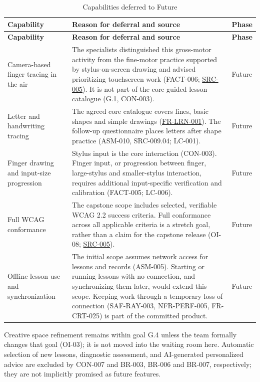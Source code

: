 \documentclass[12pt]{article}
\renewcommand{\_}{\textunderscore\allowbreak}%
\newcommand{\reqref}[1]{\hyperref[req:#1]{#1}}
\newcommand{\srcref}[1]{\hyperref[src:#1]{SRC-#1}}
\begin{document}
{\small
\begin{longtable}{@{}>{\raggedright\arraybackslash}p{}%
  >{\raggedright\arraybackslash}p{}%
  >{\raggedright\arraybackslash}p{}@{}}
\caption{Capabilities deferred to Future}
\label{tab:waiting-room}\\
\toprule
\textbf{Capability} & \textbf{Reason for deferral and source} & \textbf{Phase}
\\
\midrule
\endfirsthead
\toprule
\textbf{Capability} & \textbf{Reason for deferral and source} & \textbf{Phase}
\\
\midrule
\endhead
\bottomrule
\endlastfoot
Camera-based finger tracing in the air & The specialists distinguished this
gross-motor activity from the fine-motor practice supported by stylus-on-screen
drawing and advised prioritizing touchscreen work (FACT-006; \srcref{005}). It
is not part of the core guided lesson catalogue (G.1, CON-003). & Future \\
\addlinespace
Letter and handwriting tracing & The agreed core catalogue covers lines, basic
shapes and simple drawings (\reqref{FR-LRN-001}). The follow-up questionnaire
places letters after shape practice (ASM-010, SRC-009.04; LC-001). & Future \\
\addlinespace
Finger drawing and input-size progression & Stylus input is the core interaction
(CON-003). Finger input, or progression between finger, large-stylus and
smaller-stylus interaction, requires additional input-specific verification and
calibration (FACT-005; LC-006). & Future \\
\addlinespace
Full WCAG conformance & The capstone scope includes selected, verifiable WCAG
2.2 success criteria. Full conformance across all applicable criteria is a
stretch goal, rather than a claim for the capstone release (OI-08;
\srcref{005}). & Future \\
\addlinespace
Offline lesson use and synchronization & The initial scope assumes network
access for lessons and records (ASM-005). Starting or running lessons with no
connection, and synchronizing them later, would extend this scope. Keeping work
through a temporary loss of connection (SAF-RAY-003, NFR-PERF-005, FR-CRT-025)
is part of the committed product. &
Future \\
\end{longtable}
}

Creative space refinement remains within goal G.4 unless the team formally
changes that goal (OI-03); it is not moved into the waiting room here. Automatic
selection of new lessons, diagnostic assessment, and AI-generated personalized
advice are excluded by CON-007 and BR-003, BR-006 and BR-007, respectively; they
are not implicitly promised as future features.
\end{document}
